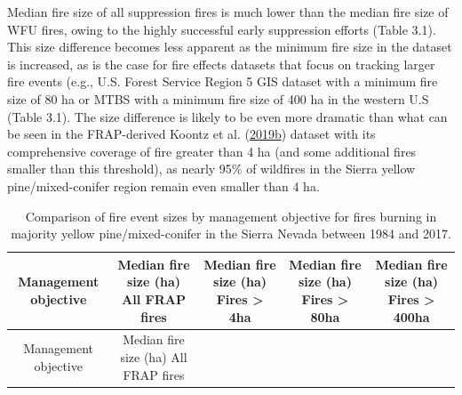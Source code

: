 \documentclass[twoside,12pt,final]{ucthesis-CA2012}
\begin{document}
\begin{ucmainmatter}
Median fire size of all suppression fires is much lower than the median
fire size of WFU fires, owing to the highly successful early suppression
efforts (Table 3.1). This size difference becomes less apparent as the
minimum fire size in the dataset is increased, as is the case for fire
effects datasets that focus on tracking larger fire events (e.g., U.S.
Forest Service Region 5 GIS dataset with a minimum fire size of 80 ha or
MTBS with a minimum fire size of 400 ha in the western U.S (Table 3.1).
The size difference is likely to be even more dramatic than what can be
seen in the FRAP-derived Koontz et al.
(\protect\hyperlink{ref-koontz2019a}{2019}\protect\hyperlink{ref-koontz2019a}{b})
dataset with its comprehensive coverage of fire greater than 4 ha (and
some additional fires smaller than this threshold), as nearly 95\% of
wildfires in the Sierra yellow pine/mixed-conifer region remain even
smaller than 4 ha.
\begin{longtable}[]{@{}ccccc@{}}
\caption{Comparison of fire event sizes by management objective for
fires burning in majority yellow pine/mixed-conifer in the Sierra Nevada
between 1984 and 2017.}\tabularnewline
\toprule
\begin{minipage}[b]{0.11\columnwidth}\centering\strut
Management objective\strut
\end{minipage} & \begin{minipage}[b]{0.19\columnwidth}\centering\strut
Median fire size (ha) All FRAP fires\strut
\end{minipage} & \begin{minipage}[b]{0.19\columnwidth}\centering\strut
Median fire size (ha) Fires \textgreater{} 4ha\strut
\end{minipage} & \begin{minipage}[b]{0.19\columnwidth}\centering\strut
Median fire size (ha) Fires \textgreater{} 80ha\strut
\end{minipage} & \begin{minipage}[b]{0.19\columnwidth}\centering\strut
Median fire size (ha) Fires \textgreater{} 400ha\strut
\end{minipage}\tabularnewline
\midrule
\endfirsthead
\toprule
\begin{minipage}[b]{0.11\columnwidth}\centering\strut
Management objective\strut
\end{minipage} & \begin{minipage}[b]{0.19\columnwidth}\centering\strut
Median fire size (ha) All FRAP fires\strut
\end{minipage} & \begin{minipage}[b]{0.19\columnwidth}\centering\strut

\end{minipage}
\end{longtable}
\end{ucmainmatter}
\end{document}
